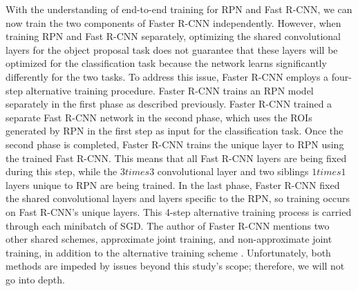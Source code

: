 With the understanding of end-to-end training for RPN and Fast R-CNN, we can now train the two components of Faster R-CNN independently. However, when training RPN and Fast R-CNN separately, optimizing the shared convolutional layers for the object proposal task does not guarantee that these layers will be optimized for the classification task because the network learns significantly differently for the two tasks. To address this issue, Faster R-CNN employs a four-step alternative training procedure. Faster R-CNN trains an RPN model separately in the first phase as described previously. Faster R-CNN trained a separate Fast R-CNN network in the second phase, which uses the ROIs generated by RPN in the first step as input for the classification task. Once the second phase is completed, Faster R-CNN trains the unique layer to RPN using the trained Fast R-CNN. This means that all Fast R-CNN layers are being fixed during this step, while the $3 times 3$ convolutional layer and two siblings $1 times 1$ layers unique to RPN are being trained. In the last phase, Faster R-CNN fixed the shared convolutional layers and layers specific to the RPN, so training occurs on Fast R-CNN's unique layers. This 4-step alternative training process is carried through each minibatch of SGD. The author of Faster R-CNN mentions two other shared schemes, approximate joint training, and non-approximate joint training, in addition to the alternative training scheme \cite{faster_rcnn_2015}. Unfortunately, both methods are impeded by issues beyond this study's scope; therefore, we will not go into depth.
